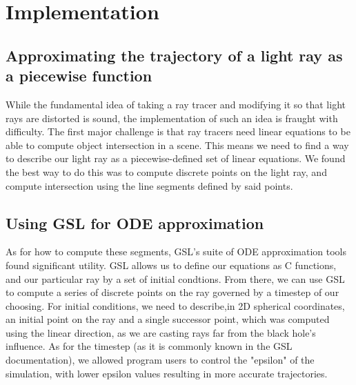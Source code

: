 \section{Implementation}
\label{sec:impl}


\subsection {Approximating the trajectory of a light ray as a piecewise function}
While the fundamental idea of taking a ray tracer and modifying it so that light rays are distorted is sound, the implementation of such an idea is fraught with difficulty. The first major challenge is that ray tracers need linear equations to be able to compute object intersection in a scene. This means we need to find a way to describe our light ray as a piecewise-defined set of linear equations. We found the best way to do this was to compute discrete points on the light ray, and compute intersection using the line segments defined by said points. 

\subsection {Using GSL for ODE approximation}
As for how to compute these segments, GSL's suite of ODE approximation tools found significant utility. GSL allows us to define our equations as C functions, and our particular ray by a set of initial condtions. From there, we can use GSL to compute a series of discrete points on the ray governed by a timestep of our choosing. For initial conditions, we need to describe,in 2D spherical coordinates, an initial point on the ray and a single successor point, which was computed using the linear direction, as we are casting rays far from the black hole's influence. As for the timestep (as it is commonly known in the GSL documentation), we allowed program users to control the "epsilon" of the simulation, with lower epsilon values resulting in more accurate trajectories. 

